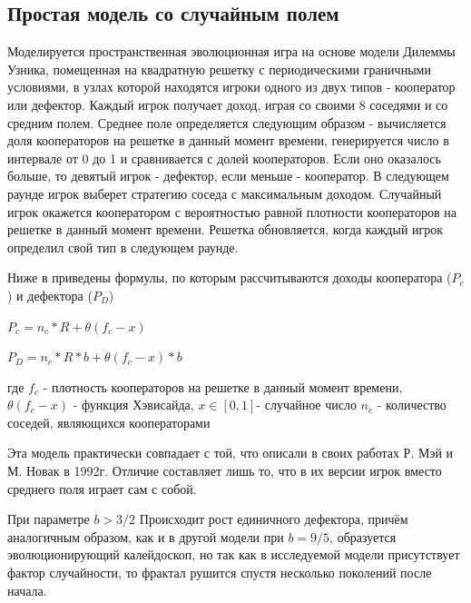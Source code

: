 \documentclass[12pt,a4paper]{article}
\begin{document}
	
	\subsection{Простая модель со случайным полем}
	
	\par Моделируется пространственная эволюционная игра на основе модели
	Дилеммы Узника, помещенная на квадратную решетку с периодическими граничными
	условиями, в узлах которой находятся игроки одного из двух типов - кооператор 
	или дефектор. Каждый игрок получает доход, играя со своими 8 соседями и со средним полем. Среднее поле определяется следующим образом - вычисляется доля кооператоров на решетке в данный момент времени, генерируется число в интервале от 0 до 1 и сравнивается с долей кооператоров. Если оно оказалось больше, то девятый игрок - дефектор, если меньше - кооператор. В следующем раунде игрок выберет стратегию соседа с максимальным доходом. Случайный игрок окажется кооператором с вероятностью
	равной плотности кооператоров на решетке в данный момент времени. Решетка 
	обновляется, когда каждый игрок определил свой тип в следующем раунде.
	
	\par Ниже в приведены формулы, по которым рассчитываются доходы кооператора ($P_{c}$) и дефектора ($P_{D}$)
	
	$ P_{c}= n_{c}*R+ \theta(f_{c}-x) $
	
	$ P_{D}= n_{c}*R*b+ \theta(f_{c}-x)*b $
	
	где $ f_{c}$ - плотность кооператоров на решетке в данный момент
	времени, $\theta(f_{c}-x)$ - функция Хэвисайда, $x \in [0,1]$- случайное число
	$n_{c}$ - количество соседей, являющихся кооператорами
	 
	
	\par Эта модель практически совпадает с той, что описали в своих работах Р. Мэй и
	М. Новак в 1992г. Отличие составляет лишь то, что в их версии игрок вместо среднего поля играет сам с собой.
	
	\par При параметре $b>3/2$ Происходит рост единичного дефектора, причём аналогичным образом, как и в другой модели при $b=9/5$, образуется эволюционирующий калейдоскоп, но так как в исследуемой модели присутствует фактор случайности, то фрактал рушится спустя несколько поколений после начала.
	
\end{document}
